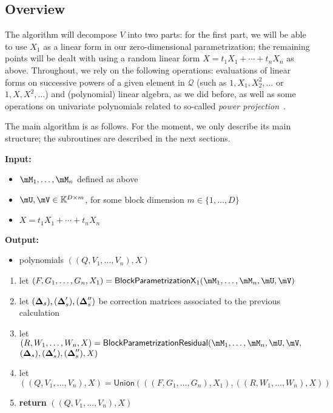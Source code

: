 \documentclass[12pt]{article}
\newcommand{\mat}[1]{\bm{\MakeUppercase{#1}}} %
\newcommand{\mainalgoname}{\mathsf{ BlockParametrization}}
\newcommand{\lf}{X}
\newcommand{\residueI}{\mathscr{Q}}
\newcommand{\sqfree}{Q}
\begin{document}
\subsection{Overview}

The algorithm will decompose $V$ into two parts: for the first part,
we will be able to use $X_1$ as a linear form in our zero-dimensional
parametrization; the remaining points will be dealt with using a
random linear form $\lf=t_1 X_1 + \cdots + t_n X_n$ as above. Throughout, we rely on the
following operations: evaluations of linear forms on successive powers
of a given element in $\residueI$ (such as $1,X_1,X_2^2,\dots$ or
$1,\lf,\lf^2,\dots$) and (polynomial) linear algebra, as we did before, as well as
some operations on univariate polynomials related to so-called {\em
  power projection}~\cite{Shoup94,Shoup99}.

The main algorithm is as follows. For the moment, we only describe its
main structure; the subroutines are described in the next sections.

\begin{algorithm}[H]
  \caption{$\mathsf{ParametrizationWithSplitting}(\mM_1,\dots,\mM_n,\mU,\mV,\lf$)}
          {\bf Input:} \vspace{-0.5em}
	  \begin{itemize}
	  \item $\mM_1,\dots,\mM_n$ defined as above
	  \item  $\mU,\mV \in \mathbb{K}^{D \times m}$, for some block dimension  $m \in \{1,\dots,D\}$
          \item $\lf =t_1 X_1 + \cdots + t_n X_n$
	  \end{itemize}
	{\bf Output:}  \vspace{-0.5em}
	\begin{itemize}
		\item polynomials $((\sqfree,V_1,\dots,V_n),\lf)$
	\end{itemize}
	\begin{enumerate}
		\item let $(F,G_1,\dots,G_n,X_1)=\mathsf{BlockParametrizationX}_1(\mM_1,\dots,\mM_n,\mU,\mV)$
                \item let $(\mat{\Delta}_s),(\mat{\Delta}'_s),(\mat{\Delta}''_s)$ be correction matrices associated
                  to the previous calculation
		\item let $(R,W_1,\dots,W_n,\lf)=\mainalgoname{\sf Residual}(\mM_1,\dots,\mM_n,\mU,\mV,$ \\
      \phantom{bla} \hfill $(\mat{\Delta}_s),(\mat{\Delta}'_s),(\mat{\Delta}''_s),\lf)$
		\item let $((\sqfree,V_1,\dots,V_n),\lf)=\mathsf{Union}(((F,G_1,\dots,G_n),X_1), ((R,W_1,\dots,W_n),\lf))$
		\item \textbf{return} $((\sqfree,V_1,\dots,V_n),\lf)$
	\end{enumerate}
\end{algorithm}
\end{document}
